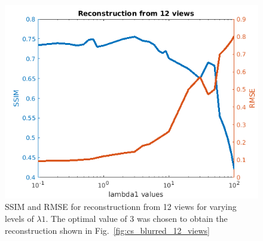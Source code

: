\documentclass{article}
\begin{document}
\begin{figure}[!h]
\centering
       \includegraphics[width=\columnwidth]{../images/potato/2D/cs_blurred_results/SSIM_RMSE_12_angles.png}
\caption{SSIM and RMSE for reconstructionn from 12 views for varying levels of $\lambda1$. The optimal value of 3 was chosen to obtain the reconstruction shown in Fig.~\ref{fig:cs_blurred_12_views}}
\label{fig:ssim_rmse_12_views}
\end{figure}
\newpage
\end{document}

